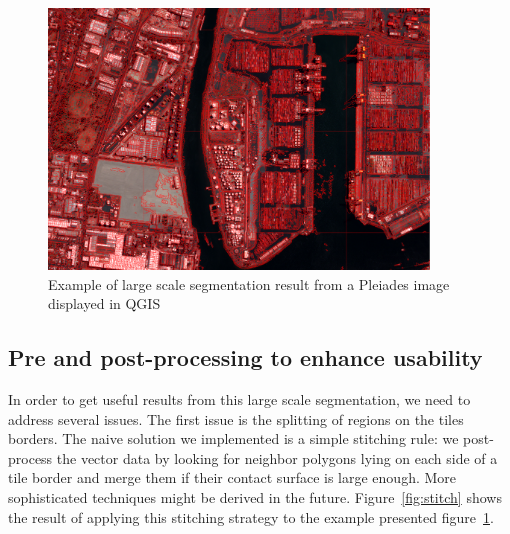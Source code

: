 \documentclass{josis}
\begin{document}
\begin{figure}[!htb]
\centering
\includegraphics[width=0.9\textwidth]{Pictures/ogrs_nostitch.png}
\caption{Example of large scale segmentation result from a Pleiades
  image displayed in QGIS}\label{fig:nostitch}
\end{figure}


\subsection{Pre and post-processing to enhance usability}

In order to get useful results from this large scale segmentation, we
need to address several issues. The first issue is the splitting of
regions on the tiles borders. The naive solution we implemented is a
simple stitching rule: we post-process the vector data by looking for
neighbor polygons lying on each side of a tile border and merge them
if their contact surface is large enough. More sophisticated
techniques might be derived in the future. Figure~\ref{fig:stitch}
shows the result of applying this stitching strategy to the example
presented figure~\ref{fig:nostitch}.
\end{document}
